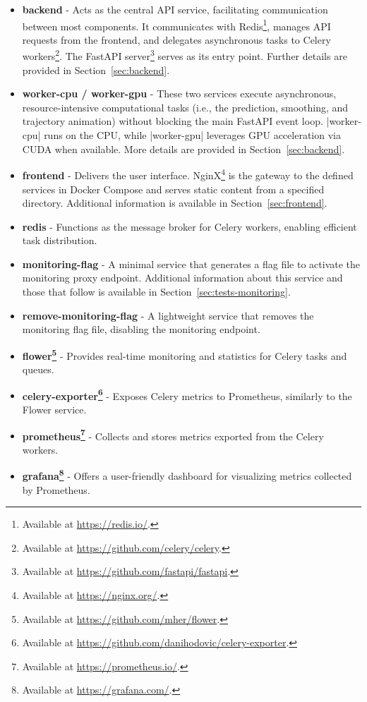 \begin{itemize}
    \item \textbf{backend} - Acts as the central API service, facilitating communication between most components. It communicates with Redis\footnote{Available at \url{https://redis.io/}.}, manages API requests from the frontend, and delegates asynchronous tasks to Celery workers\footnote{Available at \url{https://github.com/celery/celery}.}. The FastAPI server\footnote{Available at \url{https://github.com/fastapi/fastapi}.} serves as its entry point. Further details are provided in Section~\ref{sec:backend}.
    \item \textbf{worker-cpu / worker-gpu} - These two services execute asynchronous, resource-intensive computational tasks (i.e., the prediction, smoothing, and trajectory animation) without blocking the main FastAPI event loop. \inline|worker-cpu| runs on the CPU, while \inline|worker-gpu| leverages GPU acceleration via CUDA when available. More details are provided in Section~\ref{sec:backend}.
    \item \textbf{frontend} - Delivers the user interface. NginX\footnote{Available at \url{https://nginx.org/}.} is the gateway to the defined services in Docker Compose and serves static content from a specified directory. Additional information is available in Section~\ref{sec:frontend}.
    \item \textbf{redis} - Functions as the message broker for Celery workers, enabling efficient task distribution.
    \item \textbf{monitoring-flag} - A minimal service that generates a flag file to activate the monitoring proxy endpoint. Additional information about this service and those that follow is available in Section~\ref{sec:tests-monitoring}.
    \item \textbf{remove-monitoring-flag} - A lightweight service that removes the monitoring flag file, disabling the monitoring endpoint.
    \item \textbf{flower\footnote{Available at \url{https://github.com/mher/flower}.}} - Provides real-time monitoring and statistics for Celery tasks and queues.
    \item \textbf{celery-exporter\footnote{Available at \url{https://github.com/danihodovic/celery-exporter}.}} - Exposes Celery metrics to Prometheus, similarly to the Flower service.
    \item \textbf{prometheus\footnote{Available at \url{https://prometheus.io/}.}} - Collects and stores metrics exported from the Celery workers.
    \item \textbf{grafana\footnote{Available at \url{https://grafana.com/}.}} - Offers a user-friendly dashboard for visualizing metrics collected by Prometheus.
\end{itemize}


